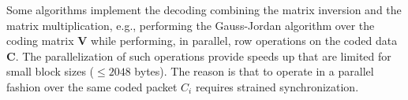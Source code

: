 Some algorithms implement the decoding combining the matrix inversion and the
matrix multiplication, e.g., performing the Gauss-Jordan algorithm over the
coding matrix $\textbf{V}$ while performing, in parallel, row operations on the
coded data $\textbf{C}$. The parallelization of such operations provide speeds
up that are limited for small block sizes ($\leq 2048$ bytes). The reason is
that to operate in a parallel fashion over the same coded packet $C_i$ requires
strained synchronization.
